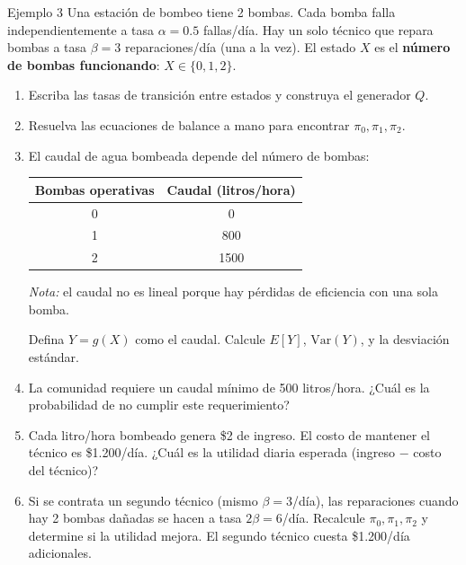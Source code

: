 \documentclass[aspectratio=1610, 10pt]{beamer}
\begin{document}
\begin{frame}{Ejemplo 3}
Una estación de bombeo tiene 2 bombas. Cada bomba falla independientemente a tasa $\alpha = 0.5$ fallas/día. Hay un solo técnico que repara bombas a tasa $\beta = 3$ reparaciones/día (una a la vez). El estado $X$ es el \textbf{número de bombas funcionando}: $X \in \{0, 1, 2\}$.

\begin{enumerate}
    \item Escriba las tasas de transición entre estados y construya el generador $Q$.
    
    \item Resuelva las ecuaciones de balance a mano para encontrar $\pi_0, \pi_1, \pi_2$.
    
    \item El caudal de agua bombeada depende del número de bombas:
    \begin{center}
    \begin{tabular}{|c|c|}
    \hline
    Bombas operativas & Caudal (litros/hora) \\
    \hline
    0 & 0 \\
    1 & 800 \\
    2 & 1500 \\
    \hline
    \end{tabular}
    \end{center}
    \emph{Nota:} el caudal no es lineal porque hay pérdidas de eficiencia con una sola bomba.
    
    Defina $Y = g(X)$ como el caudal. Calcule $E[Y]$, $\text{Var}(Y)$, y la desviación estándar.
    
    \item La comunidad requiere un caudal mínimo de 500 litros/hora. ¿Cuál es la probabilidad de no cumplir este requerimiento?
    
    \item Cada litro/hora bombeado genera \$2 de ingreso. El costo de mantener el técnico es \$1.200/día. ¿Cuál es la utilidad diaria esperada (ingreso $-$ costo del técnico)?
    
    \item Si se contrata un segundo técnico (mismo $\beta = 3$/día), las reparaciones cuando hay 2 bombas dañadas se hacen a tasa $2\beta = 6$/día. Recalcule $\pi_0, \pi_1, \pi_2$ y determine si la utilidad mejora. El segundo técnico cuesta \$1.200/día adicionales.
\end{enumerate}

\end{frame}
\end{document}
